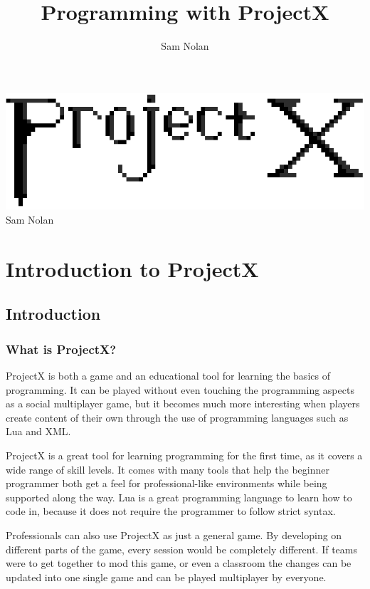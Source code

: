 \documentclass{book}
\author{Sam Nolan}
\title{Programming with ProjectX}
\begin{document}
	\vspace*{\fill}
	\begin{center}
		\centering
		\includegraphics[width=\textwidth]{ProjectX.png}
		Sam Nolan
	\end{center}
	\vspace*{\fill}
	\tableofcontents

	\part{Introduction to ProjectX}

	\chapter{Introduction}
	\section{What is ProjectX?}
	ProjectX is both a game and an educational tool for learning the basics of programming. It can be played without even touching the programming aspects as a social multiplayer game, but it becomes much more interesting when players create content of their own through the use of programming languages such as Lua and XML.
	
	ProjectX is a great tool for learning programming for the first time, as it covers a wide range of skill levels. It comes with many tools that help the beginner programmer both get a feel for professional-like environments while being supported along the way. Lua is a great programming language to learn how to code in, because it does not require the programmer to follow strict syntax.
	
	Professionals can also use ProjectX as just a general game. By developing on different parts of the game, every session would be completely different. If teams were to get together to mod this game, or even a classroom the changes can be updated into one single game and can be played multiplayer by everyone. 
\end{document}
